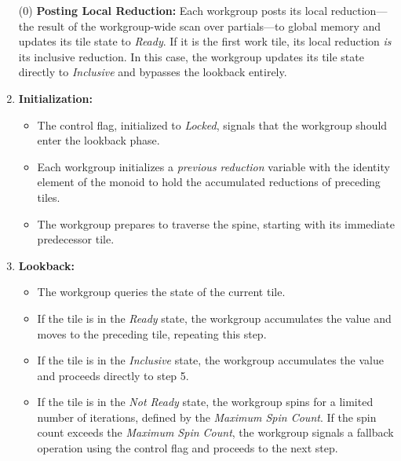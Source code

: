 \documentclass[sigconf]{acmart}
\begin{document}
\begin{enumerate}
  \item[(0)] \textbf{Posting Local Reduction:} Each workgroup posts its local reduction---the result of the workgroup-wide scan over partials---to global memory and updates its tile state to \emph{Ready}. If it is the first work tile, its local reduction \emph{is} its inclusive reduction. In this case, the workgroup updates its tile state directly to \emph{Inclusive} and bypasses the lookback entirely.

  \item \textbf{Initialization:}
  \begin{itemize}
      \item The control flag, initialized to \emph{Locked}, signals that the workgroup should enter the lookback phase.
      \item Each workgroup initializes a \emph{previous reduction} variable with the identity element of the monoid to hold the accumulated reductions of preceding tiles.
      \item The workgroup prepares to traverse the spine, starting with its immediate predecessor tile.
  \end{itemize}

  \item \textbf{Lookback:}
  \begin{itemize}
      \item The workgroup queries the state of the current tile. 
      \item If the tile is in the \emph{Ready} state, the workgroup accumulates the value and moves to the preceding tile, repeating this step.
      \item If the tile is in the \emph{Inclusive} state, the workgroup accumulates the value and proceeds directly to step 5.
      \item If the tile is in the \emph{Not Ready} state, the workgroup spins for a limited number of iterations, defined by the \emph{Maximum Spin Count}. If the spin count exceeds the \emph{Maximum Spin Count}, the workgroup signals a fallback operation using the control flag and proceeds to the next step.
  \end{itemize}


\end{enumerate}
\end{document}
